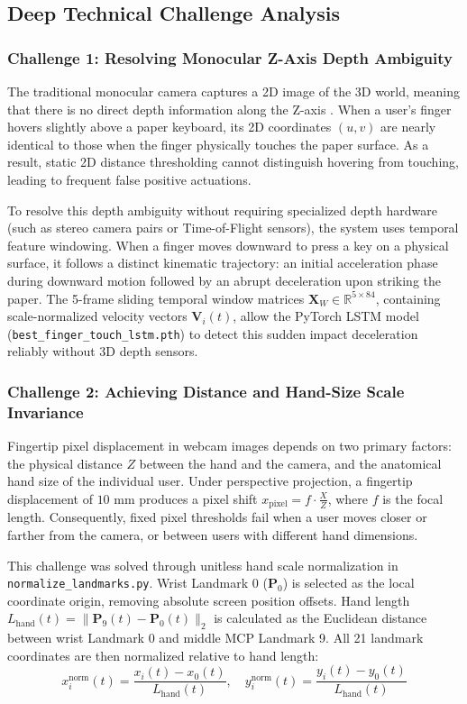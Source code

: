 \subsection{Deep Technical Challenge Analysis}
\label{subsec:imp_challenge_analysis}

\subsubsection{Challenge 1: Resolving Monocular Z-Axis Depth Ambiguity}
The traditional monocular camera captures a 2D image of the 3D world, meaning that there is no direct depth information along the Z-axis \cite{ReviewVirtualKeyboard2020, Thomas2013Camera}. When a user's finger hovers slightly above a paper keyboard, its 2D coordinates $(u, v)$ are nearly identical to those when the finger physically touches the paper surface. As a result, static 2D distance thresholding cannot distinguish hovering from touching, leading to frequent false positive actuations.

To resolve this depth ambiguity without requiring specialized depth hardware (such as stereo camera pairs or Time-of-Flight sensors), the system uses temporal feature windowing. When a finger moves downward to press a key on a physical surface, it follows a distinct kinematic trajectory: an initial acceleration phase during downward motion followed by an abrupt deceleration upon striking the paper. The 5-frame sliding temporal window matrices $\mathbf{X}_W \in \mathbb{R}^{5 \times 84}$, containing scale-normalized velocity vectors $\mathbf{V}_i(t)$, allow the PyTorch LSTM model (\texttt{best\_finger\_touch\_lstm.pth}) to detect this sudden impact deceleration reliably without 3D depth sensors.

\subsubsection{Challenge 2: Achieving Distance and Hand-Size Scale Invariance}
Fingertip pixel displacement in webcam images depends on two primary factors: the physical distance $Z$ between the hand and the camera, and the anatomical hand size of the individual user. Under perspective projection, a fingertip displacement of $10\text{ mm}$ produces a pixel shift $x_{\text{pixel}} = f \cdot \frac{X}{Z}$, where $f$ is the focal length. Consequently, fixed pixel thresholds fail when a user moves closer or farther from the camera, or between users with different hand dimensions.

This challenge was solved through unitless hand scale normalization in \texttt{normalize\_landmarks.py}. Wrist Landmark 0 ($\mathbf{P}_0$) is selected as the local coordinate origin, removing absolute screen position offsets. Hand length $L_{\text{hand}}(t) = \|\mathbf{P}_9(t) - \mathbf{P}_0(t)\|_2$ is calculated as the Euclidean distance between wrist Landmark 0 and middle MCP Landmark 9. All 21 landmark coordinates are then normalized relative to hand length:
\begin{equation}
x_i^{\text{norm}}(t) = \frac{x_i(t) - x_0(t)}{L_{\text{hand}}(t)}, \quad
y_i^{\text{norm}}(t) = \frac{y_i(t) - y_0(t)}{L_{\text{hand}}(t)}
\label{eq:scale_norm_explanation}
\end{equation}

